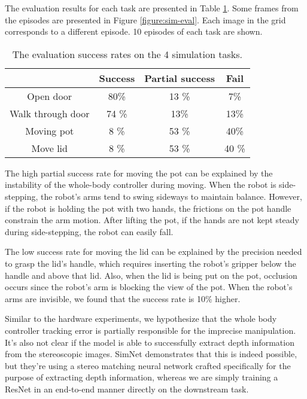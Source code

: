 The evaluation results for each task are presented in Table \ref{table:results}. Some frames from the episodes are presented in Figure \ref{figure:sim-eval}. Each image in the grid corresponds to a different episode. 10 episodes of each task are shown. 

\begin{table}[h]
	\centering
	\begin{tabular}{|c|c|c|c|}
		\hline
		& Success & Partial success & Fail\\
		\hline
		Open door & 80\% & 13 \% & 7\% \\
		\hline
		Walk through door & 74 \% & 13\% & 13\%\\
		\hline
		Moving pot & 8 \% & 53 \% & 40\%\\
		\hline
		Move lid & 8 \% & 53 \% & 40 \%\\
		\hline
	\end{tabular}
	\caption{The evaluation success rates on the 4 simulation tasks.}
	\label{table:results}
\end{table}

The high partial success rate for moving the pot can be explained by the instability of the whole-body controller during moving. When the robot is side-stepping, the robot's arms tend to swing sideways to maintain balance. However, if the robot is holding the pot with two hands, the frictions on the pot handle constrain the arm motion. After lifting the pot, if the hands are not kept steady during side-stepping, the robot can easily fall. 

The low success rate for moving the lid can be explained by the precision needed to grasp the lid's handle, which requires inserting the robot's gripper below the handle and above that lid. Also, when the lid is being put on the pot, occlusion occurs since the robot's arm is blocking the view of the pot. When the robot's arms are invisible, we found that the success rate is 10\% higher. 

Similar to the hardware experiments, we hypothesize that the whole body controller tracking error is partially responsible for the imprecise manipulation. It's also not clear if the model is able to successfully extract depth information from the stereoscopic images. SimNet \cite{kollar2021simnet} demonstrates that this is indeed possible, but they're using a stereo matching neural network crafted specifically for the purpose of extracting depth information, whereas we are simply training a ResNet in an end-to-end manner directly on the downstream task.

